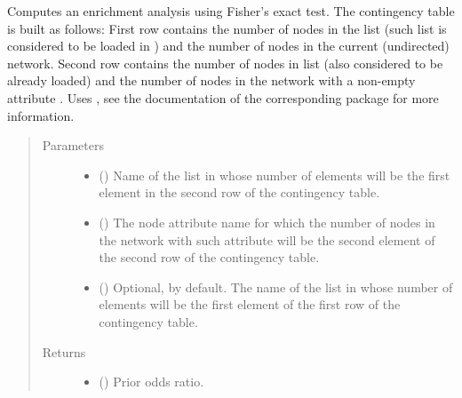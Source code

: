 \documentclass[letterpaper,10pt,english]{sphinxmanual}
\begin{document}
\begin{fulllineitems}
\begin{fulllineitems}
\label{\detokenize{reference:pypath.main.PyPath.fisher_enrichment}}
Computes an enrichment analysis using Fisher’s exact test. The
contingency table is built as follows:
First row contains the number of nodes in the  list (such
list is considered to be loaded in
) and the number of nodes in
the current (undirected) network. Second row contains the number
of nodes in  list (also considered to be already loaded)
and the number of nodes in the network with a non-empty
attribute . Uses , see
the documentation of the corresponding package for more
information.
\begin{quote}\begin{description}
\item[{Parameters}] \leavevmode\begin{itemize}
\item {} 
 () \textendash{} Name of the list in 
whose number of elements will be the first element in the
second row of the contingency table.

\item {} 
 () \textendash{} The node attribute name for which the number of nodes in the
network with such attribute will be the second element of
the second row of the contingency table.

\item {} 
 () \textendash{} Optional,  by default. The name of the list in
 whose number of elements
will be the first element of the first row of the
contingency table.

\end{itemize}

\item[{Returns}] \leavevmode
\begin{itemize}
\item {} 
() \textendash{} Prior odds ratio.


\end{itemize}
\end{description}
\end{quote}
\end{fulllineitems}
\end{fulllineitems}
\end{document}
